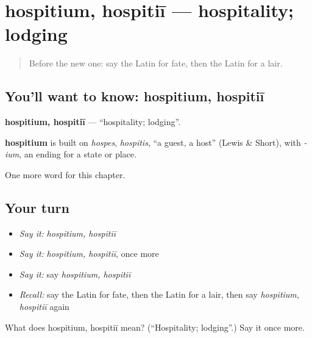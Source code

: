 \section[hospitium, hospitiī]{hospitium, hospitiī — hospitality; lodging}

\label{lesson:LA-C227-hospitium}



\begin{quote}
Before the new one: say the Latin for fate, then the Latin for a lair.
\end{quote}

\subsection*{You'll want to know: hospitium, hospitiī}
\textbf{hospitium, hospitiī} — \textquotedblleft{}hospitality; lodging\textquotedblright{}.

\begin{cousinweb}
\textbf{hospitium} is built on \emph{hospes}, \emph{hospitis}, \textquotedblleft{}a guest, a host\textquotedblright{} (Lewis \& Short), with \emph{-ium}, an ending for a state or place.
\end{cousinweb}

\begin{grammarlens}[title={What you've built}]
One more word for this chapter.
\end{grammarlens}

\subsection*{Your turn}
\begin{itemize}
\raggedright
  \item \emph{Say it:} \emph{hospitium, hospitiī}
  \item \emph{Say it:} \emph{hospitium, hospitiī}, once more
  \item \emph{Say it:} say \emph{hospitium, hospitiī}
  \item \emph{Recall:} say the Latin for fate, then the Latin for a lair, then say \emph{hospitium, hospitiī} again
\end{itemize}

\begin{tcolorbox}[breakable,colback=teal!4,colframe=teal!35!black,title={Before you move on}]
What does hospitium, hospitiī mean? (\textquotedblleft{}Hospitality; lodging\textquotedblright{}.) Say it once more.
\end{tcolorbox}
